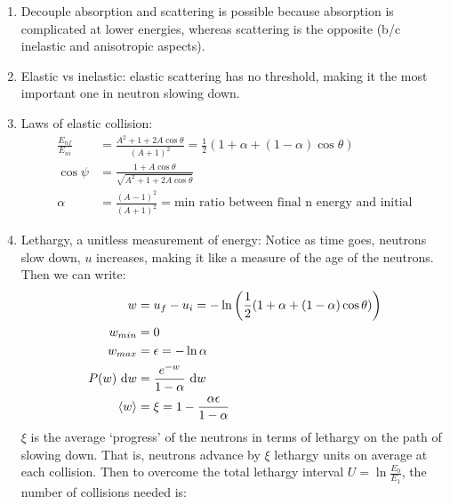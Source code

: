 \documentclass{school-22.211-notes}
\date{February 13, 2012}
\begin{document}
\maketitle



\begin{enumerate}
\item Decouple absorption and scattering is possible because absorption is complicated at lower energies, whereas scattering is the opposite (b/c inelastic and anisotropic aspects). 

\item Elastic vs inelastic: elastic scattering has no threshold, making it the most important one in neutron slowing down. 

\item Laws of elastic collision: 
  \begin{align}
    \frac{E_{nf}}{E_{ni}} &= \frac{A^2 + 1 + 2A \cos \theta}{(A+1)^2} = \frac{1}{2} \left( 1 + \alpha + (1-\alpha) \cos \theta \right) \\
    \cos \psi &= \frac{1 + A \cos \theta}{\sqrt{A^2 + 1 + 2A \cos \theta}} \\
    \alpha &= \frac{(A-1)^2}{(A+1)^2} = \mbox{min ratio between final n energy and initial} 
  \end{align}

\item Lethargy, a unitless measurement of energy:
Notice as time goes, neutrons slow down, $u$ increases, making it like a measure of the age of the neutrons. Then we can write:
\begin{align}
w &= u_f - u_i = -\ln \left( \frac{1}{2} ( 1 + \alpha + (1-\alpha) \cos \theta ) \right) \\
w_{min} &= 0 \\
w_{max} &= \epsilon = -\ln \alpha \\
P(w) \mbox{ }\mathrm{d} w &= \frac{e^{-w}}{1 - \alpha} \mbox{ }\mathrm{d} w \\
\left< w \right> &= \xi = 1 - \frac{\alpha \epsilon}{1 - \alpha} 
\end{align}
$\xi$ is the average `progress' of the neutrons in terms of lethargy on the path of slowing down. That is, neutrons advance by $\xi$ lethargy units on average at each collision. Then to overcome the total lethargy interval $U = \ln \frac{E_0}{E_1}$, the number of collisions needed is:


\end{enumerate}
\end{document}
